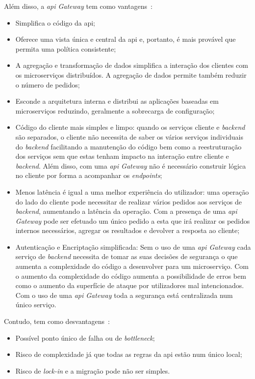 Além disso, a \textit{\acrshort{api} Gateway} tem como vantagens~\cite{apiGatInfo, apiGatInfo3}:
\begin{itemize}
    \item Simplifica o código da \acrshort{api};
    \item Oferece uma vista única e central da \acrshort{api} e, portanto, é mais provável que permita uma política consistente;
    \item A agregação e transformação de dados simplifica a interação dos clientes com os microserviços distribuídos. A agregação de dados permite também reduzir o número de pedidos;
    \item Esconde a arquitetura interna e distribui as aplicações baseadas em microserviços reduzindo, geralmente a sobrecarga de configuração;
    \item Código do cliente mais simples e limpo: quando os serviços cliente e \textit{backend} são separados, o cliente não necessita de saber os vários serviços individuais do \textit{backend} facilitando a manutenção do código bem como a reestruturação dos serviços sem que estas tenham impacto na interação entre cliente e \textit{backend}. Além disso, com uma \textit{\acrshort{api} Gateway} não é necessário construir lógica no cliente por forma a acompanhar os \textit{endpoints};
    \item Menos latência é igual a uma melhor experiência do utilizador: uma operação do lado do cliente pode necessitar de realizar vários pedidos aos serviços de \textit{backend}, aumentando a latência da operação. Com a presença de uma \textit{\acrshort{api} Gateway} pode ser efetuado um único pedido a esta que irá realizar os pedidos internos necessários, agregar os resultados e devolver a resposta ao cliente;
    \item Autenticação e Encriptação simplificada: Sem o uso de uma \textit{\acrshort{api} Gateway} cada serviço de \textit{backend} necessita de tomar as suas decisões de segurança o que aumenta a complexidade do código a desenvolver para um microserviço. Com o aumento da complexidade do código aumenta a possibilidade de erros bem como o aumento da superfície de ataque por utilizadores mal intencionados. Com o uso de uma \textit{\acrshort{api} Gateway} toda a segurança está centralizada num único serviço.
\end{itemize}

Contudo, tem como desvantagens~\cite{apiGatInfo}:
\begin{itemize}
    \item Possível ponto único de falha ou de \textit{bottleneck};
    \item Risco de complexidade já que todas as regras da \acrshort{api} estão num único local;
    \item Risco de \textit{lock-in} e a migração pode não ser simples.
\end{itemize}

